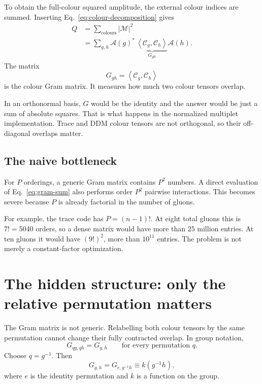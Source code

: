 \documentclass[11pt,a4paper]{article}
\newcommand{\cA}{\mathcal{A}}
\newcommand{\cC}{\mathcal{C}}
\newcommand{\cM}{\mathcal{M}}
\begin{document}
To obtain the full-colour squared amplitude, the external colour indices are
summed.  Inserting Eq.~\eqref{eq:colour-decomposition} gives
\begin{align}
  Q
  &= \sum_{\text{colours}} |\cM|^2 \\
  &= \sum_{g,h} \cA(g)^*\,
     \underbrace{\left\langle \cC_g,\cC_h\right\rangle}_{G_{g h}}
     \cA(h).
  \label{eq:gram-sum}
\end{align}
The matrix
\begin{equation}
  G_{g h}=\left\langle\cC_g,\cC_h\right\rangle
\end{equation}
is the colour Gram matrix.  It measures how much two colour tensors overlap.

In an orthonormal basis, $G$ would be the identity and the answer would be
just a sum of absolute squares.  That is what happens in the normalized
multiplet implementation.  Trace and DDM colour tensors are not orthogonal,
so their off-diagonal overlaps matter.

\subsection{The naive bottleneck}

For $P$ orderings, a generic Gram matrix contains $P^2$ numbers.  A direct
evaluation of Eq.~\eqref{eq:gram-sum} also performs order $P^2$ pairwise
interactions.  This becomes severe because $P$ is already factorial in the
number of gluons.

For example, the trace code has $P=(n-1)!$.  At eight total gluons this is
$7!=5040$ orders, so a dense matrix would have more than $25$ million
entries.  At ten gluons it would have
$(9!)^2$, more than $10^{11}$ entries.  The problem is not merely a
constant-factor optimization.

\section{The hidden structure: only the relative permutation matters}

The Gram matrix is not generic.  Relabelling both colour tensors by the same
permutation cannot change their fully contracted overlap.  In group notation,
\begin{equation}
  G_{qg,qh}=G_{g,h}
  \qquad\text{for every permutation }q.
  \label{eq:left-invariance}
\end{equation}
Choose $q=g^{-1}$.  Then
\begin{equation}
  G_{g,h}=G_{e,g^{-1}h}\equiv k(g^{-1}h),
  \label{eq:relative-kernel}
\end{equation}
where $e$ is the identity permutation and $k$ is a function on the group.
\end{document}
